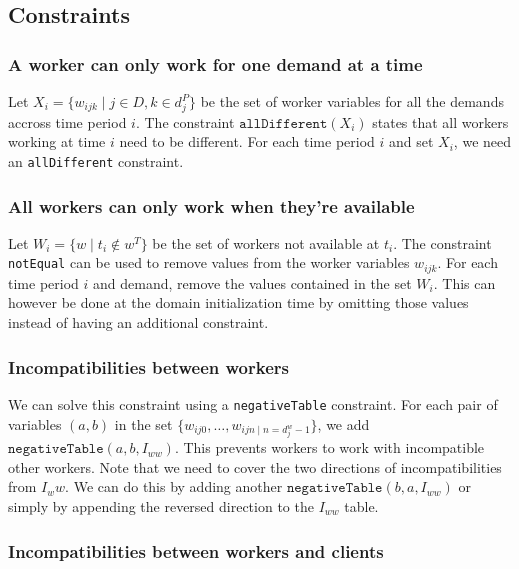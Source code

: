 \documentclass[../../thesis.tex]{subfiles}
\begin{document}
\subsection{Constraints}

\subsubsection{A worker can only work for one demand at a time}

Let $X_i = \{w_{ijk} \mid j \in D, k \in d_j^P \}$ be the set of worker variables 
for all the demands accross time period $i$. The constraint $\texttt{allDifferent}(X_i)$ states that all workers working at time $i$ need to be different.
For each time period $i$ and set $X_i$, we need an \texttt{allDifferent} constraint.

\subsubsection{All workers can only work when they’re available}

Let $W_i = \{w \mid t_i \notin w^T \}$ be the set of workers not available at $t_i$. 
The constraint \texttt{notEqual} can be used to remove values from the worker variables $w_{ijk}$.
For each time period $i$ and demand, remove the values contained in the set $W_i$.
This can however be done at the domain initialization time by omitting those values instead of having an
additional constraint.

\subsubsection{Incompatibilities between workers}

We can solve this constraint using a \texttt{negativeTable} constraint. 
For each pair of variables $(a, b)$ in the set $\{w_{ij0}, \dots, w_{ijn \mid n = d^w_j - 1}\}$, we add $\texttt{negativeTable}(a, b, I_{ww})$.
This prevents workers to work with incompatible other workers. Note that we need to cover the two directions of incompatibilities from $I_ww$. 
We can do this by adding another $\texttt{negativeTable}(b, a, I_{ww})$ or simply by appending the reversed direction to the $I_{ww}$ table.

\subsubsection{Incompatibilities between workers and clients}
\end{document}
